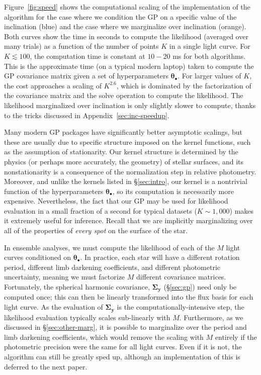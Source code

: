 \documentclass[modern]{aastex62}
\begin{document}
Figure~\ref{fig:speed} shows the computational scaling of the \Python
implementation of the algorithm for the case where we condition the GP
on a specific value of the inclination (blue) and the case where we marginalize
over inclination (orange). Both curves show the time in seconds to compute the
likelihood (averaged over many trials) as a function of the number of points $K$
in a single light curve. For $K \lesssim 100$, the computation time is constant
at $10-20$ ms for both algorithms. This is the approximate time (on a typical
modern laptop) taken to compute the GP covariance matrix given a set of
hyperparameters $\pmb{\theta}_\bullet$. For larger values of $K$, the
cost approaches a scaling of $K^{2.6}$, which is dominated by the factorization
of the covariance matrix and the solve operation to compute the likelihood.
The likelihood marginalized over inclination is only slightly slower to compute,
thanks to the tricks discussed in Appendix~\ref{sec:inc-speedup}.

Many modern GP packages \citep[e.g.,][]{Ambikasaran2015,ForemanMackey2017}
have significantly better asymptotic scalings, but these are usually due to
specific structure imposed on the kernel functions, such as the assumption
of stationarity. Our kernel structure is determined by the physics (or perhaps
more accurately, the geometry) of stellar surfaces, and its nonstationarity
is a consequence of the normalization step in relative photometry. Moreover,
and unlike the kernels listed in \S\ref{sec:intro}, our
kernel is a nontrivial function of the hyperparameters
$\pmb{\theta}_\bullet$, so its computation is necessarily more expensive.
Nevertheless, the fact that our GP may be used for likelihood evaluation
in a small fraction of a second for typical datasets ($K \sim 1{,000}$)
makes it extremely useful for inference. Recall that we are implicitly
marginalizing over all of the properties of \emph{every spot} on the surface of
the star.

In ensemble analyses, we must compute the likelihood of each of the $M$ light curves
conditioned on $\pmb{\theta}_\bullet$. In practice, each star will have a
different rotation period, different limb darkening coefficients, and different
photometric uncertainty, meaning we must factorize $M$ different covariance
matrices. Fortunately, the spherical harmonic covariance, $\pmb{\Sigma}_\mathbf{y}$
(\S\ref{sec:gp}) need only be computed once; this can then be linearly
transformed into the flux basis for each light curve. As the evaluation of
$\pmb{\Sigma}_\mathbf{y}$ is the computationally-intensive step, the
likelihood evaluation typically scales sub-linearly with $M$. Furthermore,
as we discussed in \S\ref{sec:other-marg}, it is possible to marginalize over
the period and limb darkening coefficients, which would remove the scaling
with $M$ entirely if the photometric precision were the same for all
light curves. Even if it is not, the algorithm can still be greatly sped up,
although an implementation of this is deferred to the next paper.
\end{document}
